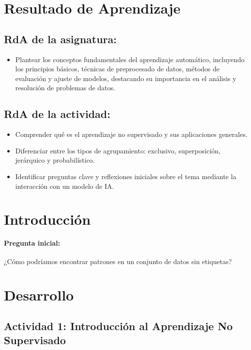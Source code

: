 \documentclass[a4,11pt]{aleph-notas}
\begin{document}
\encabezado


\section*{Resultado de Aprendizaje}

\subsection*{RdA de la asignatura:}
\begin{itemize}[leftmargin=*]
    \item Plantear los conceptos fundamentales del aprendizaje automático, incluyendo los principios básicos, técnicas de preprocesado de datos, métodos de evaluación y ajuste de modelos, destacando su importancia en el análisis y resolución de problemas de datos.
\end{itemize}

\subsection*{RdA de la actividad:}
    \begin{itemize}[leftmargin=*]
        \item Comprender qué es el aprendizaje no supervisado y sus aplicaciones generales.
        \item Diferenciar entre los tipos de agrupamiento: exclusivo, superposición, jerárquico y probabilístico.
        \item Identificar preguntas clave y reflexiones iniciales sobre el tema mediante la interacción con un modelo de IA.
    \end{itemize}

\section*{Introducción}

\paragraph{Pregunta inicial:} 
¿Cómo podríamos encontrar patrones en un conjunto de datos sin etiquetas?

\section*{Desarrollo}

\subsection*{Actividad 1: Introducción al Aprendizaje No Supervisado}
\end{document}
